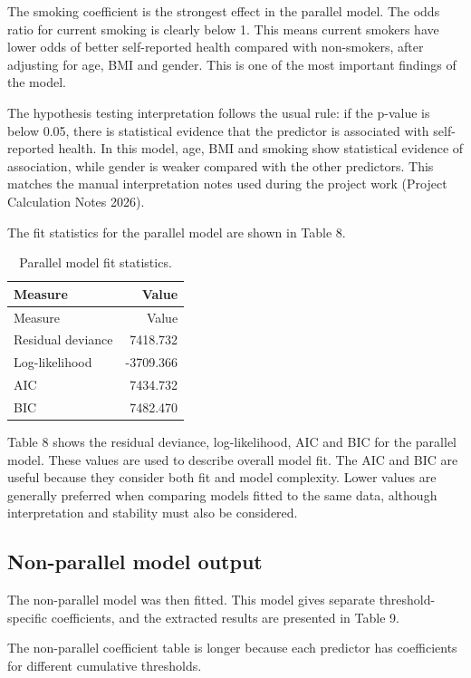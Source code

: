 \documentclass{article}
\begin{document}
The smoking coefficient is the strongest effect in the parallel model.
The odds ratio for current smoking is clearly below 1. This means
current smokers have lower odds of better self-reported health compared
with non-smokers, after adjusting for age, BMI and gender. This is one
of the most important findings of the model.

The hypothesis testing interpretation follows the usual rule: if the
p-value is below 0.05, there is statistical evidence that the predictor
is associated with self-reported health. In this model, age, BMI and
smoking show statistical evidence of association, while gender is weaker
compared with the other predictors. This matches the manual
interpretation notes used during the project work (Project Calculation
Notes 2026).

The fit statistics for the parallel model are shown in Table 8.

\begin{longtable}[]{@{}lr@{}}
\caption{Parallel model fit statistics.}\tabularnewline
\toprule\noalign{}
Measure & Value \\
\midrule\noalign{}
\endfirsthead
\toprule\noalign{}
Measure & Value \\
\midrule\noalign{}
\endhead
\bottomrule\noalign{}
\endlastfoot
Residual deviance & 7418.732 \\
Log-likelihood & -3709.366 \\
AIC & 7434.732 \\
BIC & 7482.470 \\
\end{longtable}

Table 8 shows the residual deviance, log-likelihood, AIC and BIC for the
parallel model. These values are used to describe overall model fit. The
AIC and BIC are useful because they consider both fit and model
complexity. Lower values are generally preferred when comparing models
fitted to the same data, although interpretation and stability must also
be considered.

\subsection{Non-parallel model output}\label{non-parallel-model-output}

The non-parallel model was then fitted. This model gives separate
threshold-specific coefficients, and the extracted results are presented
in Table 9.

The non-parallel coefficient table is longer because each predictor has
coefficients for different cumulative thresholds.
\end{document}
